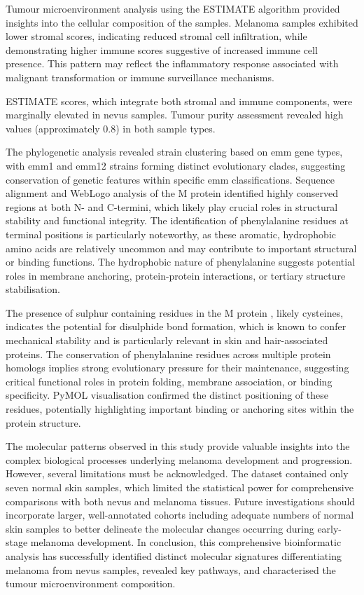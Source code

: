 \documentclass[
]{article}
\begin{document}
Tumour microenvironment analysis using the ESTIMATE algorithm provided
insights into the cellular composition of the samples. Melanoma samples
exhibited lower stromal scores, indicating reduced stromal cell
infiltration, while demonstrating higher immune scores suggestive of
increased immune cell presence. This pattern may reflect the
inflammatory response associated with malignant transformation or immune
surveillance mechanisms.

ESTIMATE scores, which integrate both stromal and immune components,
were marginally elevated in nevus samples. Tumour purity assessment
revealed high values (approximately 0.8) in both sample types.

The phylogenetic analysis revealed strain clustering based on emm gene
types, with emm1 and emm12 strains forming distinct evolutionary clades,
suggesting conservation of genetic features within specific emm
classifications. Sequence alignment and WebLogo analysis of the M
protein identified highly conserved regions at both N- and C-termini,
which likely play crucial roles in structural stability and functional
integrity. The identification of phenylalanine residues at terminal
positions is particularly noteworthy, as these aromatic, hydrophobic
amino acids are relatively uncommon and may contribute to important
structural or binding functions. The hydrophobic nature of phenylalanine
suggests potential roles in membrane anchoring, protein-protein
interactions, or tertiary structure stabilisation.

The presence of sulphur containing residues in the M protein , likely
cysteines, indicates the potential for disulphide bond formation, which
is known to confer mechanical stability and is particularly relevant in
skin and hair-associated proteins. The conservation of phenylalanine
residues across multiple protein homologs implies strong evolutionary
pressure for their maintenance, suggesting critical functional roles in
protein folding, membrane association, or binding specificity. PyMOL
visualisation confirmed the distinct positioning of these residues,
potentially highlighting important binding or anchoring sites within the
protein structure.

The molecular patterns observed in this study provide valuable insights
into the complex biological processes underlying melanoma development
and progression. However, several limitations must be acknowledged. The
dataset contained only seven normal skin samples, which limited the
statistical power for comprehensive comparisons with both nevus and
melanoma tissues. Future investigations should incorporate larger,
well-annotated cohorts including adequate numbers of normal skin samples
to better delineate the molecular changes occurring during early-stage
melanoma development. In conclusion, this comprehensive bioinformatic
analysis has successfully identified distinct molecular signatures
differentiating melanoma from nevus samples, revealed key pathways, and
characterised the tumour microenvironment composition.
\end{document}

